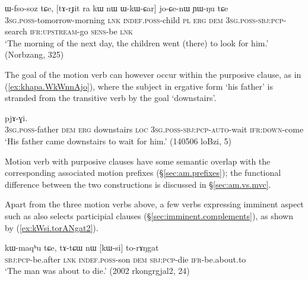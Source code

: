 \begin{exe}
	\ex \label{ex:WkWCar.loCenW}
	\gll ɯ-fso-soz tɕe, [tɤ-rɟit ra kɯ nɯ ɯ-kɯ-ɕar] jo-ɕe-nɯ ɲɯ-ŋu tɕe \\
	\textsc{3sg}.\textsc{poss}-tomorrow-morning \textsc{lnk} \textsc{indef}.\textsc{poss}-child \textsc{pl} \textsc{erg} \textsc{dem} \textsc{3sg}.\textsc{poss}-\textsc{sbj}:\textsc{pcp}-search \textsc{ifr}:\textsc{upstream}-go \textsc{sens}-be \textsc{lnk} \\
	\glt  `The morning of the next day, the children went (there) to look for him.'  (Norbzang, 325)
\end{exe}

The goal of the motion verb can however occur within the purposive clause, as in (\ref{ex:khapa.WkWnnAjo}), where the subject in ergative form  `his father' is stranded from the transitive verb  by the goal  `downstairs'.

\begin{exe}
	\ex \label{ex:khapa.WkWnnAjo}
	 pjɤ-ɣi.  \\
	\textsc{3sg}.\textsc{poss}-father \textsc{dem} \textsc{erg} downstairs \textsc{loc}    \textsc{3sg}.\textsc{poss}-\textsc{sbj}:\textsc{pcp}-\textsc{auto}-wait \textsc{ifr}:\textsc{down}-come \\
	\glt `His father came downstairs to wait for him.' (140506 loBzi, 5)
\end{exe}


Motion verb with purposive clauses have some semantic overlap with the corresponding associated motion prefixes (§\ref{sec:am.prefixes}); the functional difference between the two constructions is discussed in §\ref{sec:am.vs.mvc}.

Apart from the three motion verbs above, a few verbs expressing imminent aspect such as  also selects participial clauses (§\ref{sec:imminent.complements}), as shown by (\ref{ex:kWsi.torANgat2}).

\begin{exe}
	\ex \label{ex:kWsi.torANgat2}
	\gll kɯ-maqʰu tɕe, tɤ-tɕɯ nɯ [kɯ-si] to-rɤŋgat \\
	\textsc{sbj}:\textsc{pcp}-be.after \textsc{lnk} \textsc{indef}.\textsc{poss}-son \textsc{dem} \textsc{sbj}:\textsc{pcp}-die \textsc{ifr}-be.about.to \\
	\glt `The man was about to die.' (2002 rkongrgjal2, 24)
\end{exe} 

